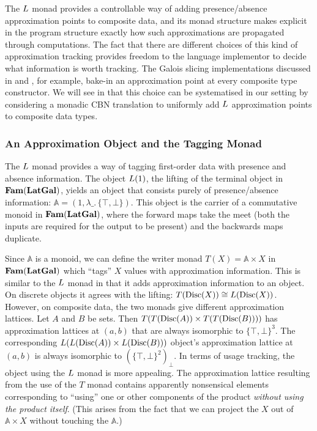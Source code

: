 The $L$ monad provides a controllable way of adding
presence/absence approximation points to composite data, and its monad
structure makes explicit in the program structure exactly how such
approximations are propagated through computations. The fact that
there are different choices of this kind of approximation tracking
provides freedom to the language implementor to decide what
information is worth tracking. The Galois slicing implementations
discussed in \citet{perera12a} and \citet{ricciotti17}, for example,
bake-in an approximation point at every composite type constructor. We
will see in  that this choice can be
systematised in our setting by considering a monadic CBN translation
to uniformly add $L$ approximation points to composite data types.

\subsubsection{An Approximation Object and the Tagging Monad}

The $L$ monad provides a way of tagging first-order data with
presence and absence information. The object $L(1)$, the lifting
of the terminal object in $\mathbf{Fam}(\mathbf{LatGal})$, yields an object that
consists purely of presence/absence information:
$\mathbb{A} = (1, \lambda\_.\,\{\top,\bot\})$. This object is the
carrier of a commutative monoid in $\mathbf{Fam}(\mathbf{LatGal})$, where the forward
maps take the meet (both the inputs are required for the output to be
present) and the backwards maps duplicate.%

Since $\mathbb{A}$ is a monoid, we can define the writer monad
$T(X) = \mathbb{A} \times X$ in $\mathbf{Fam}(\mathbf{LatGal})$ which ``tags'' $X$
values with approximation information. This is similar to the $L$
monad in that it adds approximation information to an object. On
discrete objects it agrees with the lifting:
$T(\mathrm{Disc}(X)) \cong L(\mathrm{Disc}(X))$. However, on composite data, the two
monads give different approximation lattices. Let $A$ and $B$ be sets.
Then $T(T(\mathrm{Disc}(A)) \times T(T(\mathrm{Disc}(B))))$ has approximation lattices
at $(a,b)$ that are always isomorphic to $\{\top,\bot\}^3$. The
corresponding $L(L(\mathrm{Disc}(A)) \times L(\mathrm{Disc}(B)))$ object's
approximation lattice at $(a,b)$ is always isomorphic to
$(\{\top,\bot\}^2)_\bot$.
In terms of usage tracking, the object using the $L$ monad is more
appealing. The approximation lattice resulting from the use of the $T$
monad contains apparently nonsensical elements corresponding to
``using'' one or other components of the product \emph{without using
  the product itself}. (This arises from the fact that we can project
the $X$ out of $\mathbb{A} \times X$ without touching the
$\mathbb{A}$.)



